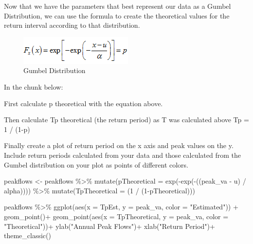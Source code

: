 \documentclass[
]{book}
\newenvironment{Shaded}{\begin{snugshade}}{\end{snugshade}}
\newcommand{\AttributeTok}[1]{\textcolor[rgb]{0.77,0.63,0.00}{#1}}
\newcommand{\DecValTok}[1]{\textcolor[rgb]{0.00,0.00,0.81}{#1}}
\newcommand{\FunctionTok}[1]{\textcolor[rgb]{0.00,0.00,0.00}{#1}}
\newcommand{\NormalTok}[1]{#1}
\newcommand{\OtherTok}[1]{\textcolor[rgb]{0.56,0.35,0.01}{#1}}
\newcommand{\SpecialCharTok}[1]{\textcolor[rgb]{0.00,0.00,0.00}{#1}}
\newcommand{\StringTok}[1]{\textcolor[rgb]{0.31,0.60,0.02}{#1}}
\begin{document}
Now that we have the parameters that best represent our data as a Gumbel Distribution, we can use the formula to create the theoretical values for the return interval according to that distribution.

\begin{figure}
\centering
\includegraphics{images/gumbel.png}
\caption{Gumbel Distribution}
\end{figure}

In the chunk below:

First calculate p theoretical with the equation above.

Then calculate Tp theoretical (the return period) as T was calculated above Tp = 1 / (1-p)

Finally create a plot of return period on the x axis and peak values on the y. Include return periods calculated from your data and those calculated from the Gumbel distribution on your plot as points of different colors.

\begin{Shaded}
\begin{Highlighting}[]
\NormalTok{peakflows }\OtherTok{\textless{}{-}}\NormalTok{ peakflows }\SpecialCharTok{\%\textgreater{}\%} \FunctionTok{mutate}\NormalTok{(}\AttributeTok{pTheoretical =} 
                                    \FunctionTok{exp}\NormalTok{(}\SpecialCharTok{{-}}\FunctionTok{exp}\NormalTok{(}\SpecialCharTok{{-}}\NormalTok{((peak\_va }\SpecialCharTok{{-}}\NormalTok{ u) }\SpecialCharTok{/}\NormalTok{ alpha)))) }\SpecialCharTok{\%\textgreater{}\%}
                           \FunctionTok{mutate}\NormalTok{(}\AttributeTok{TpTheoretical =}\NormalTok{ (}\DecValTok{1} \SpecialCharTok{/}\NormalTok{ (}\DecValTok{1}\SpecialCharTok{{-}}\NormalTok{pTheoretical)))}


\NormalTok{peakflows }\SpecialCharTok{\%\textgreater{}\%} \FunctionTok{ggplot}\NormalTok{(}\FunctionTok{aes}\NormalTok{(}\AttributeTok{x =}\NormalTok{ TpEst, }\AttributeTok{y =}\NormalTok{ peak\_va, }\AttributeTok{color =} \StringTok{"Estimated"}\NormalTok{)) }\SpecialCharTok{+}
  \FunctionTok{geom\_point}\NormalTok{()}\SpecialCharTok{+}
  \FunctionTok{geom\_point}\NormalTok{(}\FunctionTok{aes}\NormalTok{(}\AttributeTok{x =}\NormalTok{ TpTheoretical, }\AttributeTok{y =}\NormalTok{ peak\_va, }\AttributeTok{color =} \StringTok{"Theoretical"}\NormalTok{))}\SpecialCharTok{+}
  \FunctionTok{ylab}\NormalTok{(}\StringTok{"Annual Peak Flows"}\NormalTok{)}\SpecialCharTok{+}
  \FunctionTok{xlab}\NormalTok{(}\StringTok{"Return Period"}\NormalTok{)}\SpecialCharTok{+}
  \FunctionTok{theme\_classic}\NormalTok{() }
\end{Highlighting}
\end{Shaded}
\end{document}
